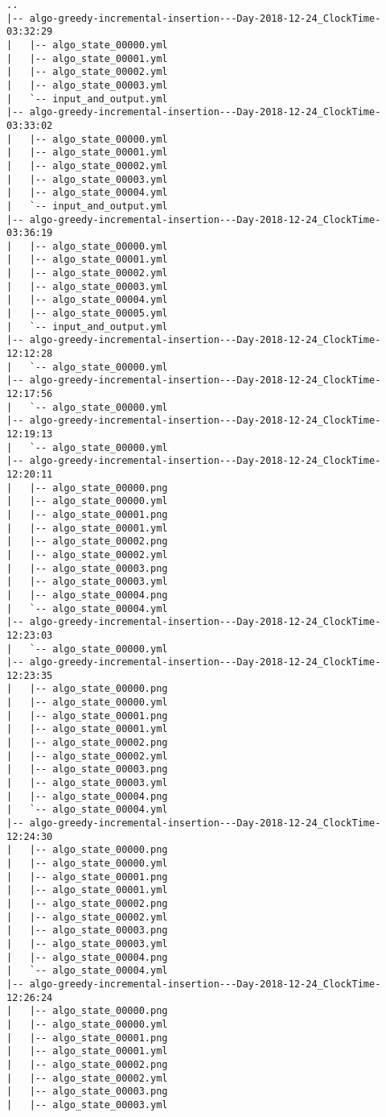 \begin{verbatim}
..
|-- algo-greedy-incremental-insertion---Day-2018-12-24_ClockTime-03:32:29
|   |-- algo_state_00000.yml
|   |-- algo_state_00001.yml
|   |-- algo_state_00002.yml
|   |-- algo_state_00003.yml
|   `-- input_and_output.yml
|-- algo-greedy-incremental-insertion---Day-2018-12-24_ClockTime-03:33:02
|   |-- algo_state_00000.yml
|   |-- algo_state_00001.yml
|   |-- algo_state_00002.yml
|   |-- algo_state_00003.yml
|   |-- algo_state_00004.yml
|   `-- input_and_output.yml
|-- algo-greedy-incremental-insertion---Day-2018-12-24_ClockTime-03:36:19
|   |-- algo_state_00000.yml
|   |-- algo_state_00001.yml
|   |-- algo_state_00002.yml
|   |-- algo_state_00003.yml
|   |-- algo_state_00004.yml
|   |-- algo_state_00005.yml
|   `-- input_and_output.yml
|-- algo-greedy-incremental-insertion---Day-2018-12-24_ClockTime-12:12:28
|   `-- algo_state_00000.yml
|-- algo-greedy-incremental-insertion---Day-2018-12-24_ClockTime-12:17:56
|   `-- algo_state_00000.yml
|-- algo-greedy-incremental-insertion---Day-2018-12-24_ClockTime-12:19:13
|   `-- algo_state_00000.yml
|-- algo-greedy-incremental-insertion---Day-2018-12-24_ClockTime-12:20:11
|   |-- algo_state_00000.png
|   |-- algo_state_00000.yml
|   |-- algo_state_00001.png
|   |-- algo_state_00001.yml
|   |-- algo_state_00002.png
|   |-- algo_state_00002.yml
|   |-- algo_state_00003.png
|   |-- algo_state_00003.yml
|   |-- algo_state_00004.png
|   `-- algo_state_00004.yml
|-- algo-greedy-incremental-insertion---Day-2018-12-24_ClockTime-12:23:03
|   `-- algo_state_00000.yml
|-- algo-greedy-incremental-insertion---Day-2018-12-24_ClockTime-12:23:35
|   |-- algo_state_00000.png
|   |-- algo_state_00000.yml
|   |-- algo_state_00001.png
|   |-- algo_state_00001.yml
|   |-- algo_state_00002.png
|   |-- algo_state_00002.yml
|   |-- algo_state_00003.png
|   |-- algo_state_00003.yml
|   |-- algo_state_00004.png
|   `-- algo_state_00004.yml
|-- algo-greedy-incremental-insertion---Day-2018-12-24_ClockTime-12:24:30
|   |-- algo_state_00000.png
|   |-- algo_state_00000.yml
|   |-- algo_state_00001.png
|   |-- algo_state_00001.yml
|   |-- algo_state_00002.png
|   |-- algo_state_00002.yml
|   |-- algo_state_00003.png
|   |-- algo_state_00003.yml
|   |-- algo_state_00004.png
|   `-- algo_state_00004.yml
|-- algo-greedy-incremental-insertion---Day-2018-12-24_ClockTime-12:26:24
|   |-- algo_state_00000.png
|   |-- algo_state_00000.yml
|   |-- algo_state_00001.png
|   |-- algo_state_00001.yml
|   |-- algo_state_00002.png
|   |-- algo_state_00002.yml
|   |-- algo_state_00003.png
|   |-- algo_state_00003.yml

\end{verbatim}
